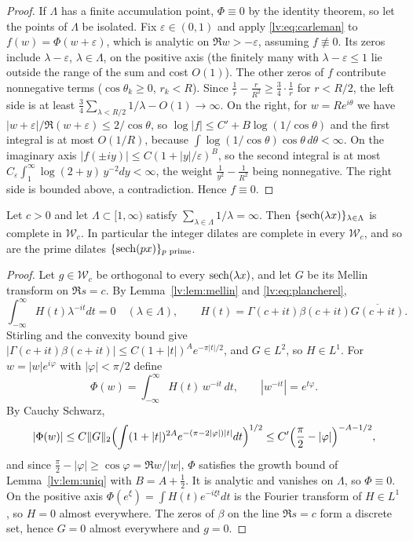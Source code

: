 \begin{proof}
If $\Lambda$ has a finite accumulation point, $\Phi\equiv0$ by the identity theorem, so let the points of $\Lambda$ be isolated. Fix $\varepsilon\in(0,1)$ and apply \eqref{lv:eq:carleman} to $f(w)=\Phi(w+\varepsilon)$, which is analytic on $\Re w>-\varepsilon$, assuming $f\not\equiv0$. Its zeros include $\lambda-\varepsilon$, $\lambda\in\Lambda$, on the positive axis (the finitely many with $\lambda-\varepsilon\le1$ lie outside the range of the sum and cost $O(1)$). The other zeros of $f$ contribute nonnegative terms ($\cos\theta_k\ge0$, $r_k<R$). Since $\frac1r-\frac r{R^2}\ge\frac34\cdot\frac1r$ for $r<R/2$, the left side is at least $\frac34\sum_{\lambda<R/2}1/\lambda-O(1)\to\infty$. On the right, for $w=Re^{i\theta}$ we have $|w+\varepsilon|/\Re(w+\varepsilon)\le2/\cos\theta$, so $\log|f|\le C'+B\log(1/\cos\theta)$ and the first integral is at most $O(1/R)$, because $\int\log(1/\cos\theta)\cos\theta\,d\theta<\infty$. On the imaginary axis $|f(\pm iy)|\le C(1+|y|/\varepsilon)^B$, so the second integral is at most $C_\varepsilon\int_1^\infty\log(2+y)\,y^{-2}dy<\infty$, the weight $\frac1{y^2}-\frac1{R^2}$ being nonnegative. The right side is bounded above, a contradiction. Hence $f\equiv0$.
\end{proof}

\begin{theorem}\label{lv:thm:single}
Let $c>0$ and let $\Lambda\subset[1,\infty)$ satisfy $\sum_{\lambda\in\Lambda}1/\lambda=\infty$. Then $\{\operatorname{sech}(\lambda x)\}_{\lambda\in\Lambda}$ is complete in $\mathcal W_c$. In particular the integer dilates are complete in every $\mathcal W_c$, and so are the prime dilates $\{\operatorname{sech}(px)\}_{p\text{ prime}}$.
\end{theorem}

\begin{proof}
Let $g\in\mathcal W_c$ be orthogonal to every $\operatorname{sech}(\lambda x)$, and let $G$ be its Mellin transform on $\Re s=c$. By Lemma~\ref{lv:lem:mellin} and \eqref{lv:eq:plancherel},
\[
\int_{-\infty}^\infty H(t)\lambda^{-it}dt=0\quad(\lambda\in\Lambda),\qquad H(t)=\Gamma(c+it)\beta(c+it)\overline{G(c+it)} .
\]
Stirling and the convexity bound give $|\Gamma(c+it)\beta(c+it)|\le C(1+|t|)^Ae^{-\pi|t|/2}$, and $G\in L^2$, so $H\in L^1$. For $w=|w|e^{i\varphi}$ with $|\varphi|<\pi/2$ define
\[
\Phi(w)=\int_{-\infty}^\infty H(t)\,w^{-it}\,dt,\qquad|w^{-it}|=e^{t\varphi}.
\]
By Cauchy Schwarz,
\[
|\Phi(w)|\le C\|G\|_2\Bigl(\int(1+|t|)^{2A}e^{-(\pi-2|\varphi|)|t|}dt\Bigr)^{1/2}\le C'\Bigl(\frac\pi2-|\varphi|\Bigr)^{-A-1/2},
\]
and since $\frac\pi2-|\varphi|\ge\cos\varphi=\Re w/|w|$, $\Phi$ satisfies the growth bound of Lemma~\ref{lv:lem:uniq} with $B=A+\frac12$. It is analytic and vanishes on $\Lambda$, so $\Phi\equiv0$. On the positive axis $\Phi(e^\xi)=\int H(t)e^{-i\xi t}dt$ is the Fourier transform of $H\in L^1$, so $H=0$ almost everywhere. The zeros of $\beta$ on the line $\Re s=c$ form a discrete set, hence $G=0$ almost everywhere and $g=0$.
\end{proof}

